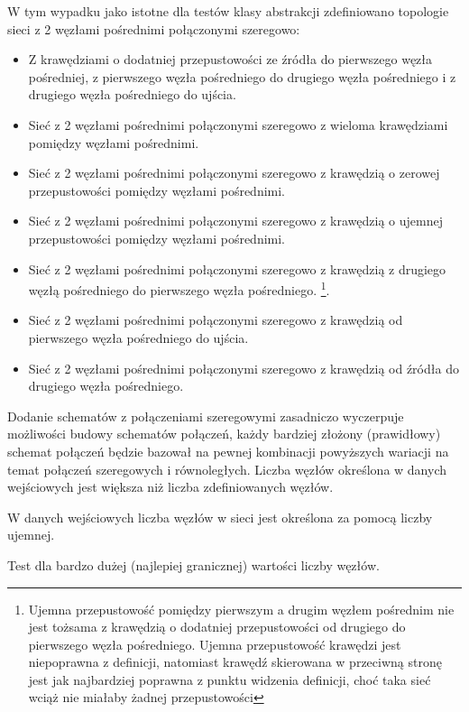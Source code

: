 \documentclass[10pt]{dokument-tiwo}
\begin{document}
W tym wypadku jako istotne dla testów klasy abstrakcji zdefiniowano topologie sieci z 2 węzłami pośrednimi połączonymi szeregowo:
\begin{itemize}
    \item Z krawędziami o dodatniej przepustowości ze źródła do pierwszego węzła pośredniej, z pierwszego węzła pośredniego do drugiego węzła pośredniego i z drugiego węzła pośredniego do ujścia.
    \item Sieć z 2 węzłami pośrednimi połączonymi szeregowo z wieloma krawędziami pomiędzy węzłami pośrednimi.
    \item Sieć z 2 węzłami pośrednimi połączonymi szeregowo z krawędzią o zerowej przepustowości pomiędzy węzłami pośrednimi.
    \item Sieć z 2 węzłami pośrednimi połączonymi szeregowo z krawędzią o ujemnej przepustowości pomiędzy węzłami pośrednimi.
    \item Sieć z 2 węzłami pośrednimi połączonymi szeregowo z krawędzią z drugiego węzłą pośredniego do pierwszego węzła pośredniego.
\footnote{Ujemna przepustowość pomiędzy pierwszym a drugim węzłem pośrednim nie jest tożsama z krawędzią o dodatniej przepustowości od drugiego do pierwszego węzła pośredniego. Ujemna przepustowość krawędzi jest niepoprawna z definicji, natomiast krawędź skierowana w przeciwną stronę jest jak najbardziej poprawna z punktu widzenia definicji, choć taka sieć wciąż nie miałaby żadnej przepustowości}.
    \item Sieć z 2 węzłami pośrednimi połączonymi szeregowo z krawędzią od pierwszego węzła pośredniego do ujścia.
    \item Sieć z 2 węzłami pośrednimi połączonymi szeregowo z krawędzią od źródła do drugiego węzła pośredniego.
\end{itemize}
Dodanie schematów z połączeniami szeregowymi zasadniczo wyczerpuje możliwości budowy schematów połączeń, każdy bardziej złożony (prawidłowy) schemat połączeń będzie bazował na pewnej kombinacji powyższych wariacji na temat połączeń szeregowych i równoległych.
Liczba węzłów określona w danych wejściowych jest większa niż liczba zdefiniowanych węzłów.

W danych wejściowych liczba węzłów w sieci jest określona za pomocą liczby ujemnej.

Test dla bardzo dużej (najlepiej granicznej) wartości liczby węzłów.
\end{document}
